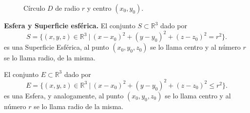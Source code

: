    \begin{figure}[H]
    \begin{center}
     \caption{C\'irculo $D$ de radio $r$ y centro $(x_0,y_0)$.}
     \end{center}
   \end{figure}
   
   
\begin{definition}\textbf{Esfera y Superficie esférica.}
    El conjunto $S \subset \mathbb{R}^3$ dado por 
    \begin{equation*}
      S = \{  (x,y,z)  \in \mathbb{R}^3 \:|\:   (x-x_0)^2+(y-y_0)^2+(z-z_0)^2=r^2 \}.
    \end{equation*}
    es una Superficie Esférica, al punto $(x_0,y_0,z_0)$ se lo llama centro  y al n\'umero $r$ se lo llama radio,  de la misma.
  
  
    El conjunto  $E\subset\mathbb{R}^3$  dado por 
    \begin{equation*}
      E = \{  (x,y,z)  \in \mathbb{R}^3 \:|\:   (x-x_0)^2+(y-y_0)^2+(z-z_0)^2\leq r^2 \}.
    \end{equation*}  es una Esfera, y analogamente,   al punto $(x_0,y_0,z_0)$ se lo llama centro  y al n\'umero $r$ se lo llama radio  de la misma.
  \end{definition}

